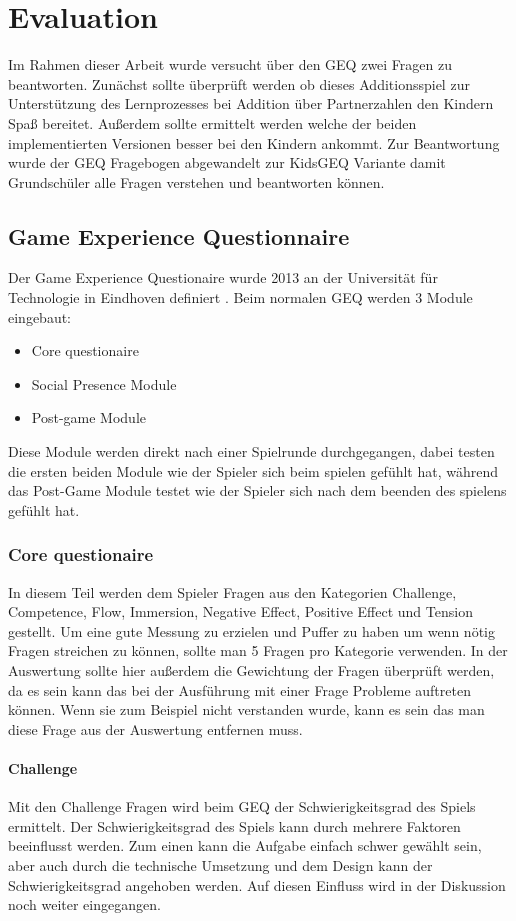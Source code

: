 \chapter{Evaluation} %
Im Rahmen dieser Arbeit wurde versucht über den GEQ zwei Fragen zu beantworten. Zunächst sollte überprüft werden ob dieses Additionsspiel zur Unterstützung des Lernprozesses bei Addition über Partnerzahlen den Kindern Spaß bereitet. Außerdem sollte ermittelt werden welche der beiden implementierten Versionen besser bei den Kindern ankommt. Zur Beantwortung wurde der GEQ Fragebogen abgewandelt zur KidsGEQ Variante damit Grundschüler alle Fragen verstehen und beantworten können.
\section{Game Experience Questionnaire}
Der Game Experience Questionaire wurde 2013 an der Universität für Technologie in Eindhoven definiert \cite{IJsselsteijn2013}.
Beim normalen GEQ werden 3 Module eingebaut:
\begin{itemize}
\item Core questionaire
\item Social Presence Module
\item Post-game Module
\end{itemize}
Diese Module werden direkt nach einer Spielrunde durchgegangen, dabei testen die ersten beiden Module wie der Spieler sich beim spielen gefühlt hat, während das Post-Game Module testet wie der Spieler sich nach dem beenden des spielens gefühlt hat.
\subsection{Core questionaire}
In diesem Teil werden dem Spieler Fragen aus den Kategorien Challenge, Competence, Flow, Immersion, Negative Effect, Positive Effect und Tension gestellt. Um eine gute Messung zu erzielen und Puffer zu haben um wenn nötig Fragen streichen zu können, sollte man 5 Fragen pro Kategorie verwenden. In der Auswertung sollte hier außerdem die Gewichtung der Fragen überprüft werden, da es sein kann das bei der Ausführung mit einer Frage Probleme auftreten können. Wenn sie zum Beispiel nicht verstanden wurde, kann es sein das man diese Frage aus der Auswertung entfernen muss.
\subsubsection{Challenge}
Mit den Challenge Fragen wird beim GEQ der Schwierigkeitsgrad des Spiels ermittelt. Der Schwierigkeitsgrad des Spiels kann durch mehrere Faktoren beeinflusst werden. Zum einen kann die Aufgabe einfach schwer gewählt sein, aber auch durch die technische Umsetzung und dem Design kann der Schwierigkeitsgrad angehoben werden. Auf diesen Einfluss wird in der Diskussion noch weiter eingegangen.
